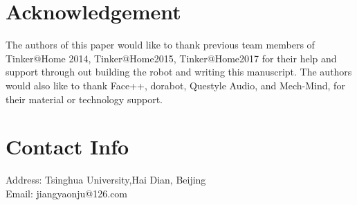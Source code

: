 \documentclass[runningheads,a4paper]{llncs}
\begin{document}


\section*{Acknowledgement}
The authors of this paper would like to thank previous team members of Tinker@Home 2014, Tinker@Home2015, Tinker@Home2017 for their help and support through out building the robot and writing this manuscript. The authors would also like to thank Face++, dorabot, Questyle Audio, and Mech-Mind, for their material or technology support. 

\section*{Contact Info}

	\noindent
Address: Tsinghua University,Hai Dian, Beijing \\
Email: jiangyaonju@126.com 


%

\end{document}

